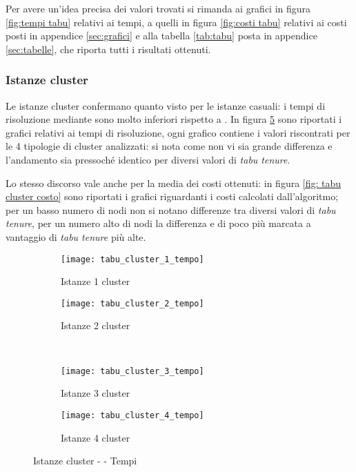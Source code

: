 Per avere un'idea precisa dei valori trovati si rimanda ai grafici in figura \ref{fig:tempi tabu} relativi ai tempi, a quelli in figura \ref{fig:costi tabu} relativi ai costi posti in appendice \ref{sec:grafici} e alla tabella \ref{tab:tabu} posta in appendice \ref{sec:tabelle}, che riporta tutti i risultati ottenuti.

\subsubsection{Istanze cluster}
Le istanze cluster confermano quanto visto per le istanze casuali: i tempi di risoluzione mediante \tabu sono molto inferiori rispetto a .
In figura \ref{fig: tabu cluster tempo} sono riportati i grafici relativi ai tempi di risoluzione, ogni grafico contiene i valori riscontrati per le 4 tipologie di cluster analizzati: si nota come non vi sia grande differenza e l'andamento sia pressoché identico per diversi valori di \emph{tabu tenure}.

Lo stesso discorso vale anche per la media dei costi ottenuti: in figura \ref{fig: tabu cluster costo} sono riportati i grafici riguardanti i costi calcolati dall'algoritmo; per un basso numero di nodi non si notano differenze tra diversi valori di \emph{tabu tenure}, per un numero alto di nodi la differenza e di poco più marcata a vantaggio di \emph{tabu tenure} più alte.

\begin{figure}[H]
	\centering
	\begin{subfigure}[b]{.45\textwidth}
		\texttt{[image: tabu\_cluster\_1\_tempo]}
		\caption{Istanze 1 cluster}
		\label{fig:tabu cluster 1 tempo}
	\end{subfigure}
	\quad
	\begin{subfigure}[b]{.45\textwidth}
		\texttt{[image: tabu\_cluster\_2\_tempo]}
		\caption{Istanze 2 cluster}
		\label{fig:tabu cluster 2 tempo}
	\end{subfigure}
	\\
	\begin{subfigure}[b]{.45\textwidth}
		\texttt{[image: tabu\_cluster\_3\_tempo]}
		\caption{Istanze 3 cluster}
		\label{fig:tabu cluster 3 tempo}
	\end{subfigure}
	\quad
	\begin{subfigure}[b]{.45\textwidth}
		\texttt{[image: tabu\_cluster\_4\_tempo]}
		\caption{Istanze 4 cluster}
		\label{fig:tabu cluster 4 tempo}
	\end{subfigure}
	\caption{Istanze cluster - \tabu{} - Tempi}
	\label{fig: tabu cluster tempo}
\end{figure}



